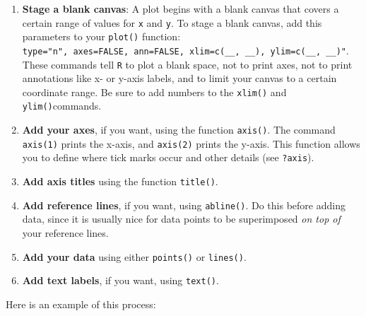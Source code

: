 \documentclass[
]{book}
\begin{document}
\begin{enumerate}
\def\labelenumi{\arabic{enumi}.}
\item
  \textbf{Stage a blank canvas}: A plot begins with a blank canvas that covers a certain range of values for \texttt{x} and \texttt{y}. To stage a blank canvas, add this parameters to your \texttt{plot()} function: \texttt{type="n",\ axes=FALSE,\ ann=FALSE,\ xlim=c(\_\_,\ \_\_),\ ylim=c(\_\_,\ \_\_)"}. These commands tell \texttt{R} to plot a blank space, not to print axes, not to print annotations like x- or y-axis labels, and to limit your canvas to a certain coordinate range. Be sure to add numbers to the \texttt{xlim()} and \texttt{ylim()}commands.
\item
  \textbf{Add your axes}, if you want, using the function \texttt{axis()}. The command \texttt{axis(1)} prints the x-axis, and \texttt{axis(2)} prints the y-axis. This function allows you to define where tick marks occur and other details (see \texttt{?axis}).
\item
  \textbf{Add axis titles} using the function \texttt{title()}.
\item
  \textbf{Add reference lines}, if you want, using \texttt{abline()}. Do this before adding data, since it is usually nice for data points to be superimposed \emph{on top of} your reference lines.
\item
  \textbf{Add your data} using either \texttt{points()} or \texttt{lines()}.
\item
  \textbf{Add text labels}, if you want, using \texttt{text()}.
\end{enumerate}

Here is an example of this process:
\end{document}
